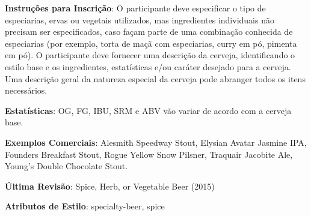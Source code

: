 \textbf{Instruções para Inscrição}: O participante deve especificar o tipo de especiarias, ervas ou vegetais utilizados, mas ingredientes individuais não precisam ser especificados, caso façam parte de uma combinação conhecida de especiarias (por exemplo, torta de maçã com especiarias, curry em pó, pimenta em pó). O participante deve fornecer uma descrição da cerveja, identificando o estilo base e os ingredientes, estatísticas e/ou caráter desejado para a cerveja. Uma descrição geral da natureza especial da cerveja pode abranger todos os itens necessários.

\textbf{Estatísticas}: OG, FG, IBU, SRM e ABV vão variar de acordo com a cerveja base.

\textbf{Exemplos Comerciais}: Alesmith Speedway Stout, Elysian Avatar Jasmine IPA, Founders Breakfast Stout, Rogue Yellow Snow Pilsner, Traquair Jacobite Ale, Young's Double Chocolate Stout.

\textbf{Última Revisão}: Spice, Herb, or Vegetable Beer (2015)

\textbf{Atributos de Estilo}: specialty-beer, spice
